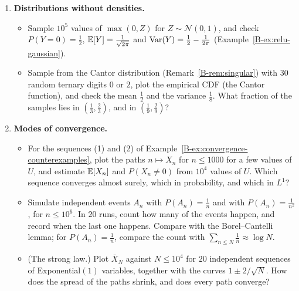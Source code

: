 \begin{enumerate}[label=\textbf{P\arabic*.}, leftmargin=*]
    \item \textbf{Distributions without densities.}
    \begin{itemize}
        \item Sample $10^5$ values of $\max(0, Z)$ for $Z \sim \mathcal{N}(0, 1)$, and check $P(Y = 0) = \frac{1}{2}$, $\mathbb{E}[Y] = \frac{1}{\sqrt{2\pi}}$ and $\operatorname{Var}(Y) = \frac{1}{2} - \frac{1}{2\pi}$ (Example~\ref{B-ex:relu-gaussian}).
        \item Sample from the Cantor distribution (Remark~\ref{B-rem:singular}) with $30$ random ternary digits $0$ or $2$, plot the empirical CDF (the Cantor function), and check the mean $\frac{1}{2}$ and the variance $\frac{1}{8}$. What fraction of the samples lies in $(\frac{1}{3}, \frac{2}{3})$, and in $(\frac{1}{9}, \frac{2}{9})$?
    \end{itemize}

    \item \textbf{Modes of convergence.}
    \begin{itemize}
        \item For the sequences (1) and (2) of Example~\ref{B-ex:convergence-counterexamples}, plot the paths $n \mapsto X_n$ for $n \leq 1000$ for a few values of $U$, and estimate $\mathbb{E}[X_n]$ and $P(X_n \neq 0)$ from $10^4$ values of $U$. Which sequence converges almost surely, which in probability, and which in $L^1$?
        \item Simulate independent events $A_n$ with $P(A_n) = \frac{1}{n}$ and with $P(A_n) = \frac{1}{n^2}$, for $n \leq 10^6$. In $20$ runs, count how many of the events happen, and record when the last one happens. Compare with the Borel--Cantelli lemma; for $P(A_n) = \frac{1}{n}$, compare the count with $\sum_{n \leq N}\frac{1}{n} \approx \log N$.
        \item (The strong law.) Plot $\bar X_N$ against $N \leq 10^4$ for $20$ independent sequences of Exponential$(1)$ variables, together with the curves $1 \pm 2/\sqrt{N}$. How does the spread of the paths shrink, and does every path converge?
    \end{itemize}


\end{enumerate}
